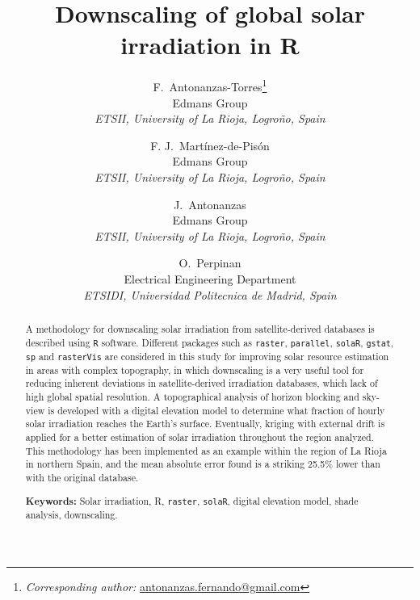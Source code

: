 \documentclass[11pt, english]{article}
\begin{document}

  \title{Downscaling of global solar irradiation in R}

\author{
  F.~Antonanzas-Torres\footnote{\textit{Corresponding author:} \url{antonanzas.fernando@gmail.com}}\\
  Edmans Group\\
  \textit{ETSII, University of La Rioja, Logroño, Spain}
  \and
  F. J.~Martínez-de-Pisón\\
  Edmans Group\\
 \textit{ETSII, University of La Rioja, Logroño, Spain}
  \and
  J.~Antonanzas\\
  Edmans Group\\
  \textit{ETSII, University of La Rioja, Logroño, Spain}
  \and
  O.~Perpinan\\
  Electrical Engineering Department\\
  \textit{ETSIDI, Universidad Politecnica de Madrid, Spain}
}

\maketitle

  \begin{abstract}

    A methodology for downscaling solar irradiation from
    satellite-derived databases is described using \texttt{R}
    software. Different packages such as \texttt{raster},
    \texttt{parallel}, \texttt{solaR}, \texttt{gstat}, \texttt{sp} and
    \texttt{rasterVis} are considered in this study for improving
    solar resource estimation in areas with complex topography, in
    which downscaling is a very useful tool for reducing inherent
    deviations in satellite-derived irradiation databases, which lack
    of high global spatial resolution. A topographical analysis of
    horizon blocking and sky-view is developed with a digital
    elevation model to determine what fraction of hourly solar
    irradiation reaches the Earth’s surface. Eventually, kriging with
    external drift is applied for a better estimation of solar
    irradiation throughout the region analyzed. This methodology has
    been implemented as an example within the region of La Rioja in
    northern Spain, and the mean absolute error found is a striking
    25.5\% lower than with the original database.

    \textbf{Keywords: }Solar irradiation, R, \texttt{raster},
    \texttt{solaR}, digital elevation model, shade analysis,
    downscaling.
  \end{abstract}
\end{document}
